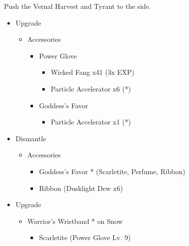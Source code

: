 \begin{multicols}{2}
Push the Vernal Harvest and Tyrant to the side.

\begin{upgrade}
  \begin{itemize}
    \item Upgrade
          \begin{itemize}
            \item Accessories
                  \begin{itemize}
                    \item Power Glove
                          \begin{itemize}
                            \item Wicked Fang x41 (3x EXP)
                            \item Particle Accelerator x6 (*)
                          \end{itemize}
                    \item Goddess's Favor
                          \begin{itemize}
                            \item Particle Accelerator x1 (*)
                          \end{itemize}
                  \end{itemize}
          \end{itemize}
    \item Dismantle
          \begin{itemize}
            \item Accessories
                  \begin{itemize}
                    \item Goddess's Favor * (Scarletite, Perfume, Ribbon)
                    \item Ribbon (Dusklight Dew x6)
                  \end{itemize}
          \end{itemize}
    \item Upgrade
          \begin{itemize}
            \item Warrior's Wristband * on Snow
                  \begin{itemize}
                    \item Scarletite (Power Glove Lv. 9)
                  \end{itemize}
          \end{itemize}
  \end{itemize}
\end{upgrade}
\end{multicols}
